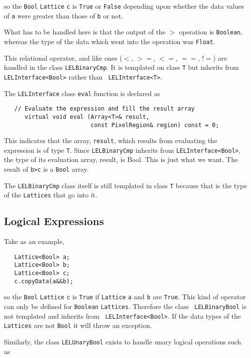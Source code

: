 so the {\tt Bool} {\tt Lattice} {\tt c} is {\tt True} or {\tt False}
depending upon whether the data values of {\tt a} were greater than
those of {\tt b} or not. 

What has to be handled here is that the output of the $>$ operation
is {\tt Boolean}, whereas the type of the data which went into the operation
was {\tt Float}.

This relational operator, and like ones ($<$, $>=$, $<=$, $==$, !$=$)
are handled in the class {\tt LELBinaryCmp}.  It is templated on class
{\tt T} but inherits from {\tt LELInterface<Bool>} rather than {\tt
LELInterface<T>}. 

The {\tt LELInterface} class {\tt eval} function is declared as

\begin{verbatim}
   // Evaluate the expression and fill the result array
      virtual void eval (Array<T>& result,
                         const PixelRegion& region) const = 0;
\end{verbatim}
 

This indicates that the array, {\tt result}, which results from
evaluating the expression is of type {\tt T}.  Since {\tt LELBinaryCmp}
inherits from {\tt LELInterface<Bool>}, the type of its evaluation
array, result, is Bool.  This is just what we want.  The result of {\tt b>c}
is a {\tt Bool} array. 

The {\tt LELBinaryCmp} class itself is still templated in class {\tt T}
because that is the type of the {\tt Lattices} that go into it. 


\subsection {Logical Expressions}

Take as an example,

\begin{verbatim}
   Lattice<Bool> a;
   Lattice<Bool> b;
   Lattice<Bool> c;
   c.copyData(a&&b);
\end{verbatim}

so the {\tt Bool} {\tt Lattice} {\tt c} is {\tt True} if {\tt Lattice}
{\tt a} and {\tt b} are {\tt True}.  This kind of operator can only be
defined for {\tt Boolean} {\tt Lattices}.  Therefore the class {\tt
LELBinaryBool} is not templated and inherits from {\tt
LELInterface<Bool>}.  If the data types of the {\tt Lattices} are not
{\tt Bool} it will throw an exception. 

Similarly, the class {\tt LELUnaryBool} exists to handle unary logical
operations such as  

